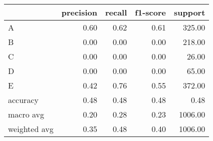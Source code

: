 \begin{tabular}{|l|r|r|r|r|}
\hline
{} &  precision &  recall &  f1-score &  support \\
\hline
A            &       0.60 &    0.62 &      0.61 &   325.00 \\
B            &       0.00 &    0.00 &      0.00 &   218.00 \\
C            &       0.00 &    0.00 &      0.00 &    26.00 \\
D            &       0.00 &    0.00 &      0.00 &    65.00 \\
E            &       0.42 &    0.76 &      0.55 &   372.00 \\
accuracy     &       0.48 &    0.48 &      0.48 &     0.48 \\
macro avg    &       0.20 &    0.28 &      0.23 &  1006.00 \\
weighted avg &       0.35 &    0.48 &      0.40 &  1006.00 \\
\hline
\end{tabular}
